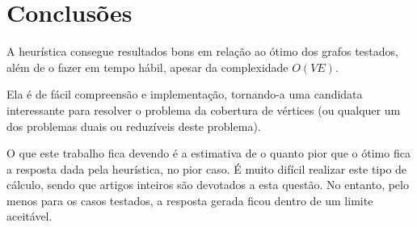 \part{Conclusões}
\label{part:conclusoes}
A heurística consegue resultados bons em relação ao ótimo dos grafos
testados, além de o fazer em tempo hábil, apesar da complexidade
$O(VE)$.

Ela é de fácil compreensão e implementação, tornando-a uma candidata
interessante para resolver o problema da cobertura de vértices (ou
qualquer um dos problemas duais ou reduzíveis deste problema).

O que este trabalho fica devendo é a estimativa de o quanto pior que o
ótimo fica a resposta dada pela heurística, no pior caso. É muito
difícil realizar este tipo de cálculo, sendo que artigos inteiros são
devotados a esta questão. No entanto, pelo menos para os casos
testados, a resposta gerada ficou dentro de um limite aceitável.
